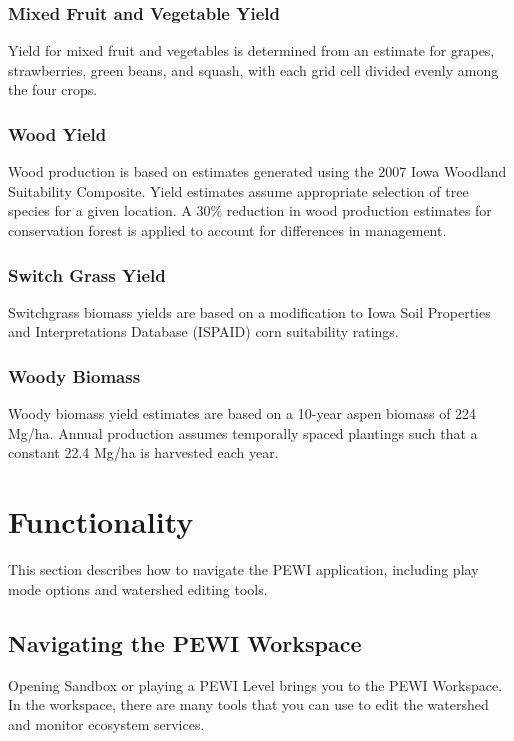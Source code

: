 \documentclass[11pt]{article}
\begin{document}
\subsubsection{Mixed Fruit and Vegetable Yield}
Yield for mixed fruit and vegetables is determined from an estimate for grapes, strawberries, green beans, and squash, with each grid cell divided evenly among the four crops. 

\subsubsection{Wood Yield}
Wood production is based on estimates generated using the 2007 Iowa Woodland Suitability Composite.\cite{44} Yield estimates assume appropriate selection of tree species for a given location. A 30\% reduction in wood production estimates for conservation forest is applied to account for differences in management.

\subsubsection{Switch Grass Yield}
Switchgrass biomass yields are based on a modification to Iowa Soil Properties and Interpretations Database (ISPAID) corn suitability ratings.\cite{45}

\subsubsection{Woody Biomass}
Woody biomass yield estimates are based on a 10-year aspen biomass of 224 Mg/ha.\cite{46}  Annual production assumes temporally spaced plantings such that a constant 22.4 Mg/ha is harvested each year.

\newpage

\section{Functionality}
This section describes how to navigate the PEWI application, including play mode options and watershed editing tools.

\subsection{Navigating the PEWI Workspace}
Opening Sandbox or playing a PEWI Level brings you to the PEWI Workspace. In the workspace, there are many tools that you can use to edit the watershed and monitor ecosystem services.
\end{document}

